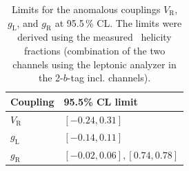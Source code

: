 \begin{table}[h!]                                                                                                                                
  \centering
  \begin{tabular}{l | l}
Coupling & 95.5\% CL limit\\
\hline
\hline
  $V_{\text{R}}$ & $[-0.24, 0.31]$\\
  $g_{\text{L}}$ & $[-0.14, 0.11]$\\
   $g_{\text{R}}$ & $[-0.02, 0.06], [0.74, 0.78]$\\
\end{tabular}
\caption{Limits for the anomalous couplings $V_{\text{R}}$, $g_{\text{L}}$, and $g_{\text{R}}$ at 95.5\,\% CL. The limits were derived using the measured \Wboson\ helicity fractions (combination of the two channels using the leptonic analyzer in the 2-$b$-tag incl. channels).}
\label{tab:1d_limits_2ch}
\end{table}







